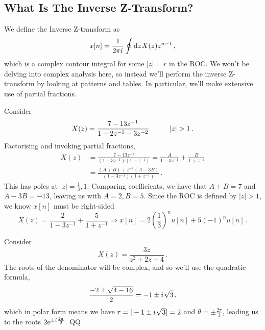 \subsection{What Is The Inverse Z-Transform?}
%
We define the Inverse Z-transform as
%
\begin{equation}
  x[n] = \frac{1}{2\pi{i\mkern1mu}}\oint \mathrm{d}z\mkern1mu X(z)z^{n-1} \,,
\end{equation}
%
which is a complex contour integral for some $|z| = r$ in the ROC.
We won't be delving into complex analysis here, so instead we'll perform
the inverse Z-transform by looking at patterns and tables. In particular,
we'll make extensive use of partial fractions.
%
\begin{exmp}
  Consider
  \begin{displaymath}
    X(z) = \frac{7 - 13z^{-1}}{1 - 2z^{-1} - 3z^{-2}} \hspace{10mm} |z| > 1 \,.
  \end{displaymath}
  Factorising and invoking partial fractions,
  \begin{align*}
    X(z) &= \frac{7 - 13z^{-1}}{(1-3z^{-1})(1 + z^{-1})}
    = \frac{A}{1-3z^{-1}} + \frac{B}{1 + z^{-1}} \\
    &= \frac{(A+B) + z^{-1}(A-3B)}{(1-3z^{-1})(1+z^{-1})} \,.
  \end{align*}
  This has poles at $|z| = \frac{1}{3}, 1$.
  Comparing coefficients, we have that $A+B = 7$ and $A - 3B = -13$, leaving
  us with $A=2, B=5$. Since the ROC is defined by $|z| > 1$, we know $x[n]$
  must be right-sided
  \begin{displaymath}
    X(z) = \frac{2}{1 - 3z^{-1}} + \frac{5}{1 + z^{-1}} \Longrightarrow x[n]
    = 2\left(\frac{1}{3}\right)^n u[n] + 5\left(-1\right)^n u[n] \,.
  \end{displaymath}
\end{exmp}
%
\begin{exmp}
  Consider
  \begin{displaymath}
    X(z) = \frac{3z}{z^2 + 2z + 4} \,.
  \end{displaymath}
  The roots of the denominator will be complex, and so we'll use the quadratic
  formula,
  \begin{displaymath}
    \frac{-2\pm\sqrt{4 - 16}}{2} = -1 \pm {i\mkern1mu}\sqrt{3} \,,
  \end{displaymath}
  which in polar form means we have $r = |-1\pm{i\mkern1mu}\sqrt{3}| = 2$ and
  $\theta = \pm\frac{2\pi}{3}$, leading us to the roots $2\mathrm{e}^{\pm{i\mkern1mu}\frac{2\pi}{3}}$.
  QQ
\end{exmp}
